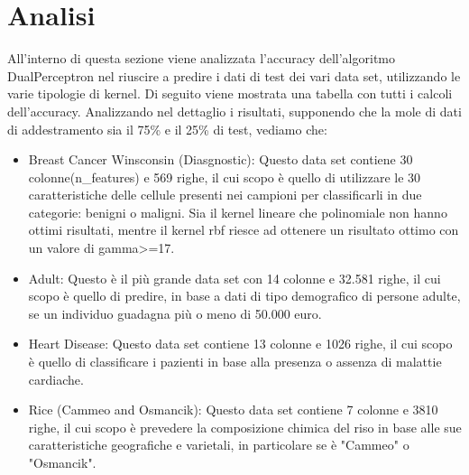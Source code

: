 \documentclass{article}
\begin{document}
	\section{Analisi}
	All'interno di questa sezione viene analizzata l'accuracy dell'algoritmo DualPerceptron nel riuscire a predire i dati di test dei vari data set, utilizzando le varie tipologie di kernel. Di seguito viene mostrata una tabella con tutti i calcoli dell'accuracy.  
	Analizzando nel dettaglio i risultati, supponendo che la mole di dati di addestramento sia il 75\% e il 25\% di test, vediamo che:
	\begin{itemize}
		\item Breast Cancer Winsconsin (Diasgnostic): Questo data set contiene 30 colonne(n\_features) e 569 righe, il cui scopo è quello di utilizzare le 30 caratteristiche delle cellule presenti nei campioni per classificarli in due categorie: benigni o maligni. Sia il kernel lineare che polinomiale non hanno ottimi risultati, mentre il kernel rbf riesce ad ottenere un risultato ottimo con un valore di gamma>=17.
		\item Adult: Questo è il più grande data set con 14 colonne e 32.581 righe, il cui scopo è quello di predire, in base a dati di tipo demografico di persone adulte, se un individuo guadagna più o meno di 50.000 euro.
		\item Heart Disease: Questo data set contiene 13 colonne e 1026 righe, il cui scopo è quello di classificare i pazienti in base alla presenza o assenza di malattie cardiache.
		\item Rice (Cammeo and Osmancik): Questo data set contiene 7 colonne e 3810 righe, il cui scopo è prevedere la composizione chimica del riso in base alle sue caratteristiche geografiche e varietali, in particolare se è "Cammeo" o "Osmancik".
	\end{itemize}
\end{document}
